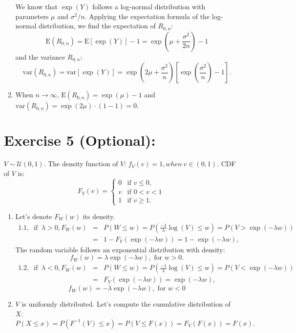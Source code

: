 \documentclass[12pt,thmsa]{article}
\begin{document}
\begin{enumerate}
\begin{enumerate}
We know that $\exp(Y)$ follows a log-normal distribution with parameters $\mu$ and $\sigma^2/n$.
Applying the expectation formula of the log-normal distribution, we find the expectation of $R_{0,n}$:
\begin{equation*}
\text{E}(R_{0,n})=\text{E}[\exp(Y)]-1=\exp\left(\mu + \frac{\sigma^2}{2 n} \right)-1
\end{equation*}
and the variance $R_{0,n}$:
\begin{equation*}
\text{var}(R_{0,n})=\text{var}[\exp(Y)]=\exp\left(2\mu + \frac{\sigma^2}{n} \right) \left[
 \exp\left(\frac{\sigma^2}{n} \right) -1\right].
\end{equation*}
  \item When $n \rightarrow \infty$, $\text{E}(R_{0,n})=\exp(\mu)-1$ and
$\text{var}(R_{0,n})=\exp(2\mu)\cdot (1-1)=0$.
\end{enumerate}

\section*{ Exercise 5 (Optional):}
$V \sim \mathcal{U}(0,1)$. The density function of $V$: $f_{V}(v)=1, when \ v\in (0,1)$. CDF of $V$ is: 
$$F_V(v) = \begin{cases}
   0    & \text{if } v \leq 0 ,  \\
   v      & \text{if } 0< v < 1 \\
    1   & \text{if } v\geq 1.
  \end{cases} $$
\begin{enumerate}
   \item Let's denote $F_W(w)$ its density. 
  \begin{eqnarray*}
  1.1, \ \text{ if } \ \lambda >0,  F_W(w) &=& P(W \leq w )=P( \frac{-1}{\lambda} \log(V) \leq w) = P(V> \exp(-\lambda w))\\
     &=& 1-F_V(\exp(-\lambda w))= 1-\exp(-\lambda w) ,
  \end{eqnarray*}
 The random variable follows an exponential distribution with density:
  \begin{equation*}
  f_W(w)= \lambda \exp(-\lambda w) ,  \text{ for } w>0.
  \end{equation*}
 \begin{eqnarray*}
 1.2, \ \text{ if } \ \lambda <0,  F_W(w) &=& P(W \leq w )=P( \frac{-1}{\lambda} \log(V) \leq w) = P(V< \exp(-\lambda w))\\
     &=& F_V(\exp(-\lambda w))= \exp(-\lambda w) ,
  \end{eqnarray*}
\begin{equation*}
f_W(w)= -\lambda \exp(-\lambda w) ,  \text{ for } w<0
 \end{equation*}
  \item $V$ is uniformly distributed. Let's compute the cumulative distribution of $X$:
  \begin{equation*}
  P(X \leq x)=P( F^{-1}(V) \leq x)=P(V \leq F(x))=F_V(F(x))=F(x).
  \end{equation*}


\end{enumerate}
\end{enumerate}
\end{document}
